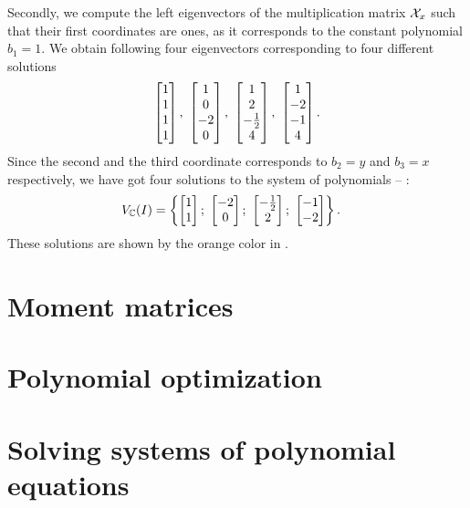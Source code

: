 \begin{example}
  Secondly, we compute the left eigenvectors of the multiplication matrix $\mathcal{X}_x$ such that their first coordinates are ones, as it corresponds to the constant polynomial $b_1 = 1$.
  We obtain following four eigenvectors corresponding to four different solutions
  \begin{align}
    \begin{bmatrix} 1\\ 1\\ 1\\ 1 \end{bmatrix},\
    \begin{bmatrix} 1\\ 0\\ -2\\ 0 \end{bmatrix},\
    \begin{bmatrix} 1\\ 2\\ -\frac{1}{2}\\ 4 \end{bmatrix},\
    \begin{bmatrix} 1\\ -2\\ -1\\ 4 \end{bmatrix}.
  \end{align}
  Since the second and the third coordinate corresponds to $b_2 = y$ and $b_3 = x$ respectively, we have got four solutions to the system of polynomials  -- :
  \begin{align}
    V_{\mathbb{C}}(I) &= \left\{
        \begin{bmatrix} 1\\ 1 \end{bmatrix};\
        \begin{bmatrix} -2\\ 0 \end{bmatrix};\
        \begin{bmatrix} -\frac{1}{2}\\ 2 \end{bmatrix};\
        \begin{bmatrix} -1\\ -2 \end{bmatrix}
      \right\}.
  \end{align}
  These solutions are shown by the orange color in .
\end{example}

\section{Moment matrices}

\section{Polynomial optimization}

\section{Solving systems of polynomial equations}
